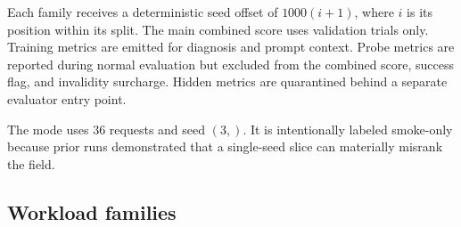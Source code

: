 \documentclass[11pt]{article}
\newcommand{\code}[1]{\texttt{\detokenize{#1}}}
\begin{document}
Each family receives a deterministic seed offset of \(1000(i+1)\), where \(i\) is its
position within its split.  The main combined score uses validation trials only.
Training metrics are emitted for diagnosis and prompt context.  Probe metrics are
reported during normal evaluation but excluded from the combined score, success flag,
and invalidity surcharge.  Hidden metrics are quarantined behind a separate evaluator
entry point.

The \code{--quick} mode uses 36 requests and seed \((3,)\).  It is intentionally labeled
smoke-only because prior runs demonstrated that a single-seed slice can materially
misrank the field.

\subsection{Workload families}
\end{document}
